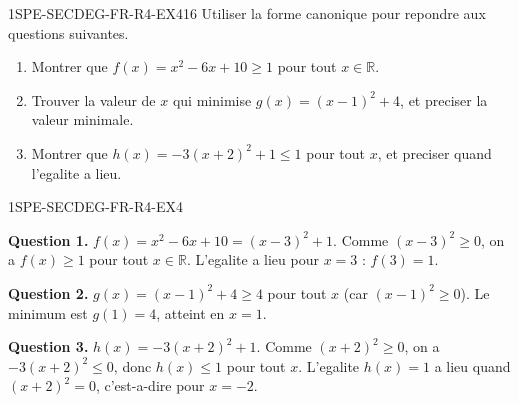 
\begin{exercice}{1SPE-SECDEG-FR-R4-EX4}{1}{6}
Utiliser la forme canonique pour repondre aux questions suivantes.
\begin{enumerate}
  \item Montrer que $f(x) = x^2 - 6x + 10 \geq 1$ pour tout $x \in \mathbb{R}$.
  \item Trouver la valeur de $x$ qui minimise $g(x) = (x-1)^2 + 4$, et preciser la valeur minimale.
  \item Montrer que $h(x) = -3(x+2)^2 + 1 \leq 1$ pour tout $x$, et preciser quand l'egalite a lieu.
\end{enumerate}
\end{exercice}


\begin{corrige}{1SPE-SECDEG-FR-R4-EX4}

\textbf{Question 1.} $f(x) = x^2 - 6x + 10 = (x-3)^2 + 1$. Comme $(x-3)^2 \geq 0$, on a $f(x) \geq 1$ pour tout $x \in \mathbb{R}$. L'egalite a lieu pour $x = 3$ : $f(3) = 1$.

\textbf{Question 2.} $g(x) = (x-1)^2 + 4 \geq 4$ pour tout $x$ (car $(x-1)^2 \geq 0$). Le minimum est $g(1) = 4$, atteint en $x = 1$.

\textbf{Question 3.} $h(x) = -3(x+2)^2 + 1$. Comme $(x+2)^2 \geq 0$, on a $-3(x+2)^2 \leq 0$, donc $h(x) \leq 1$ pour tout $x$. L'egalite $h(x) = 1$ a lieu quand $(x+2)^2 = 0$, c'est-a-dire pour $x = -2$.

\end{corrige}

